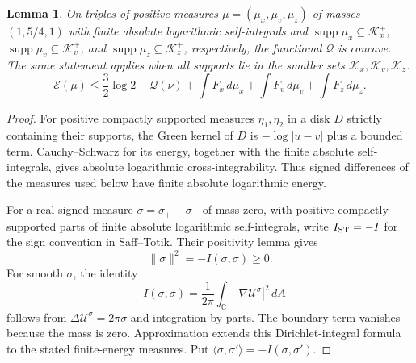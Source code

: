 \documentclass{amsart}
\newtheorem{lemma}{Lemma}[section]
\numberwithin{equation}{section}
\numberwithin{table}{section}
\begin{document}
\begin{lemma}\label{lem:concavity}
On triples of positive measures $\mu=(\mu_x,\mu_v,\mu_z)$ of masses
$(1,5/4,1)$ with finite absolute logarithmic self-integrals and
$\operatorname{supp}\mu_x\subseteq\mathcal K_x^+$,
$\operatorname{supp}\mu_v\subseteq\mathcal K_v^+$, and
$\operatorname{supp}\mu_z\subseteq\mathcal K_z^+$, respectively, the functional
$\mathcal Q$ is concave. The same statement applies when all supports lie
in the smaller sets $\mathcal K_x,\mathcal K_v,\mathcal K_z$.
\begin{equation}\label{eq:dual-inequality}
 \mathcal E(\mu)\le\frac32\log2-\mathcal Q(\nu)
            +\int F_x\,d\mu_x+\int F_v\,d\mu_v+\int F_z\,d\mu_z.
\end{equation}
\end{lemma}
\begin{proof}
For positive compactly supported measures $\eta_1,\eta_2$ in a disk $D$
strictly containing their supports, the Green kernel of $D$ is
$-\log|u-v|$ plus a bounded term. Cauchy--Schwarz for its energy, together
with the finite absolute self-integrals, gives absolute logarithmic
cross-integrability. Thus signed differences of the measures used below have
finite absolute logarithmic energy.

For a real signed measure $\sigma=\sigma_+-\sigma_-$ of mass zero, with
positive compactly supported parts of finite absolute logarithmic
self-integrals, write $I_{\rm ST}=-I$ for the sign convention in
Saff--Totik. Their positivity lemma \cite[Lemma~I.1.8]{ST} gives
\[
 \|\sigma\|^2=-I(\sigma,\sigma)\ge0.
\]
For smooth $\sigma$, the identity
\[
 -I(\sigma,\sigma)=\frac1{2\pi}\int_{\mathbb C}
 |\nabla\mathcal U^\sigma|^2\,dA
\]
follows from $\Delta\mathcal U^\sigma=2\pi\sigma$ and integration by
parts. The boundary term vanishes because the mass is zero. Approximation
extends this Dirichlet-integral formula to the stated finite-energy
measures. Put
$\langle\sigma,\sigma'\rangle=-I(\sigma,\sigma')$.


\end{proof}
\end{document}
